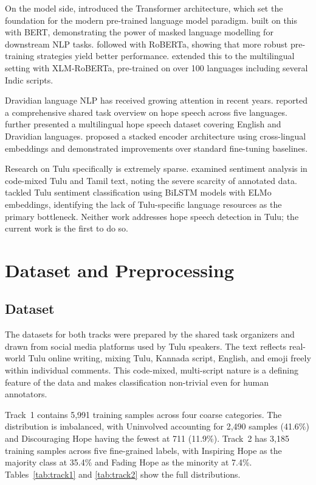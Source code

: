 \documentclass[11pt]{article}
\begin{document}
On the model side, \citet{vaswani2017} introduced the Transformer architecture, which set the
foundation for the modern pre-trained language
model paradigm. \citet{devlin2019} built on this
with BERT, demonstrating the power of masked
language modelling for downstream NLP tasks.
\citet{liu2019} followed with RoBERTa, showing
that more robust pre-training strategies yield better
performance. \citet{conneau2020} extended this to
the multilingual setting with XLM-RoBERTa, pre-trained on over 100 languages including several
Indic scripts.

Dravidian language NLP has received growing
attention in recent years. \citet{chakravarthi2022overview} reported a comprehensive shared task overview on
hope speech across five languages. \citet{chakravarthi2022multilingual} further presented a multilingual hope speech
dataset covering English and Dravidian languages.
\citet{sundar2022} proposed a stacked encoder architecture using cross-lingual embeddings and demonstrated improvements over standard fine-tuning
baselines.

Research on Tulu specifically is extremely
sparse. \citet{shetty2023} examined sentiment analysis in
code-mixed Tulu and Tamil text, noting the severe
scarcity of annotated data. \citet{ehsan2023} tackled
Tulu sentiment classification using BiLSTM models with ELMo embeddings, identifying the lack
of Tulu-specific language resources as the primary
bottleneck. Neither work addresses hope speech
detection in Tulu; the current work is the first to do
so.

\section{Dataset and Preprocessing}

\subsection{Dataset}

The datasets for both tracks were prepared by the
shared task organizers and drawn from social media platforms used by Tulu speakers. The text reflects real-world Tulu online writing, mixing Tulu,
Kannada script, English, and emoji freely within individual comments. This code-mixed, multi-script
nature is a defining feature of the data and makes
classification non-trivial even for human annotators.

Track~1 contains 5,991 training samples across
four coarse categories. The distribution is imbalanced, with Uninvolved accounting for 2,490 samples (41.6\%) and Discouraging Hope having the
fewest at 711 (11.9\%). Track~2 has 3,185 training
samples across five fine-grained labels, with Inspiring Hope as the majority class at 35.4\% and Fading
Hope as the minority at 7.4\%. Tables~\ref{tab:track1} and \ref{tab:track2} show
the full distributions.
\end{document}
